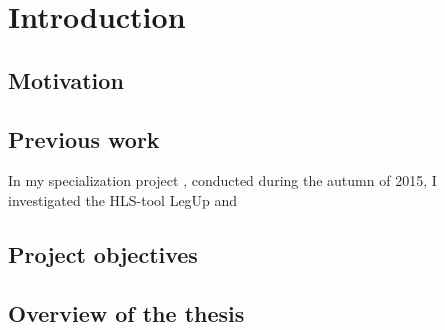 \chapter{Introduction}
\label{chp:introduction} 
\section{\label{sec:motivation}Motivation}



\section{Previous work}
In my specialization project \cite{holm2015pro}, conducted during the autumn of 2015, I investigated the HLS-tool LegUp and 

\section{Project objectives}


\section{Overview of the thesis}
